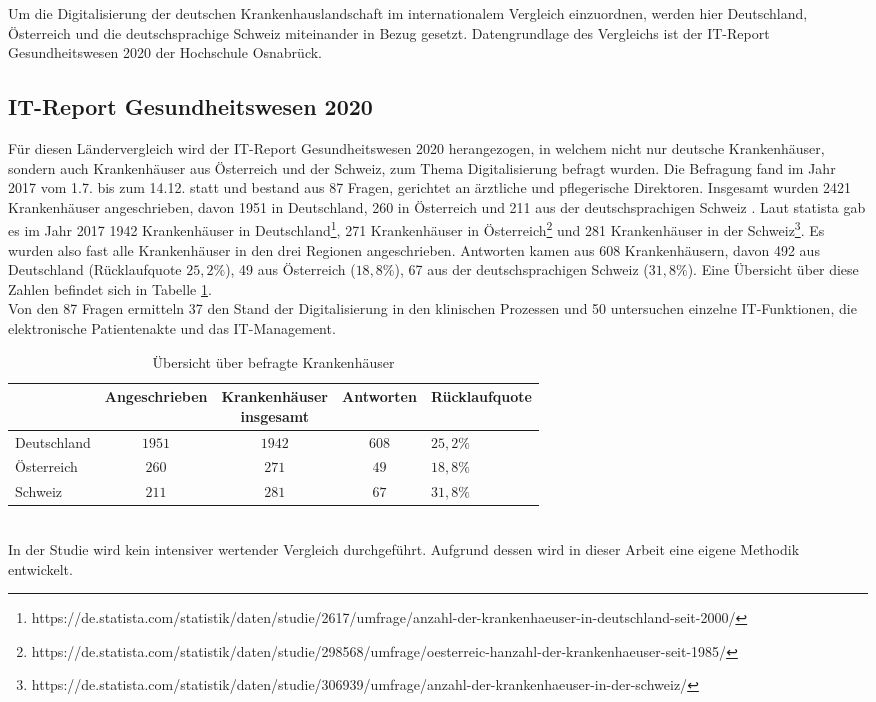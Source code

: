 Um die Digitalisierung der deutschen Krankenhauslandschaft im internationalem Vergleich einzuordnen, werden hier Deutschland, Österreich und die deutschsprachige Schweiz miteinander in Bezug gesetzt. Datengrundlage des Vergleichs ist der IT-Report Gesundheitswesen 2020 der Hochschule Osnabrück.
\subsection{IT-Report Gesundheitswesen 2020}
Für diesen Ländervergleich wird der IT-Report Gesundheitswesen 2020 herangezogen, in welchem nicht nur deutsche Krankenhäuser, sondern auch Krankenhäuser aus Österreich und der Schweiz, zum Thema Digitalisierung befragt wurden. Die Befragung fand im Jahr 2017 vom 1.7. bis zum 14.12. statt und bestand aus 87 Fragen, gerichtet an ärztliche und pflegerische Direktoren. Insgesamt wurden 2421 Krankenhäuser angeschrieben, davon 1951 in Deutschland, 260 in Österreich und 211 aus der deutschsprachigen Schweiz \parencite{huebner2020}. Laut statista gab es im Jahr 2017 1942 Krankenhäuser in Deutschland\footnote{https://de.statista.com/statistik/daten/studie/2617/umfrage/anzahl-der-krankenhaeuser-in-deutschland-seit-2000/}, 271 Krankenhäuser in Österreich\footnote{https://de.statista.com/statistik/daten/studie/298568/umfrage/oesterreic-hanzahl-der-krankenhaeuser-seit-1985/} und 281 Krankenhäuser in der Schweiz\footnote{https://de.statista.com/statistik/daten/studie/306939/umfrage/anzahl-der-krankenhaeuser-in-der-schweiz/}. Es wurden also fast alle Krankenhäuser in den drei Regionen angeschrieben. Antworten kamen aus 608 Krankenhäusern, davon 492 aus Deutschland (Rücklaufquote $25,2\%$), 49 aus Österreich ($18,8\%$), 67 aus der deutschsprachigen Schweiz ($31,8\%$). Eine Übersicht über diese Zahlen befindet sich in Tabelle \ref{tab:anzahl-krankenhaeuser}.\\

Von den 87 Fragen ermitteln 37 den Stand der Digitalisierung in den klinischen Prozessen und 50 untersuchen einzelne IT-Funktionen, die elektronische Patientenakte und das IT-Management.\\
\begin{table}[ht]
\begin{center}
	\begin{tabular}{l|c|c|c|l}
		&Angeschrieben&\parbox[c]{13ex}{\centering Krankenhäuser\\ insgesamt}&Antworten&Rücklaufquote\\
		\hline
		Deutschland&$1951$&$1942$&$608$&$25,2\%$\\
		Österreich&$260$&$271$&$49$&$18,8\%$\\
		Schweiz&$211$&$281$&$67$&$31,8\%$\\
	\end{tabular}
\end{center}
\caption{Übersicht über befragte Krankenhäuser}	
\label{tab:anzahl-krankenhaeuser}
\end{table}\\
In der Studie wird kein intensiver wertender Vergleich durchgeführt. Aufgrund dessen wird in dieser Arbeit eine eigene Methodik entwickelt.
